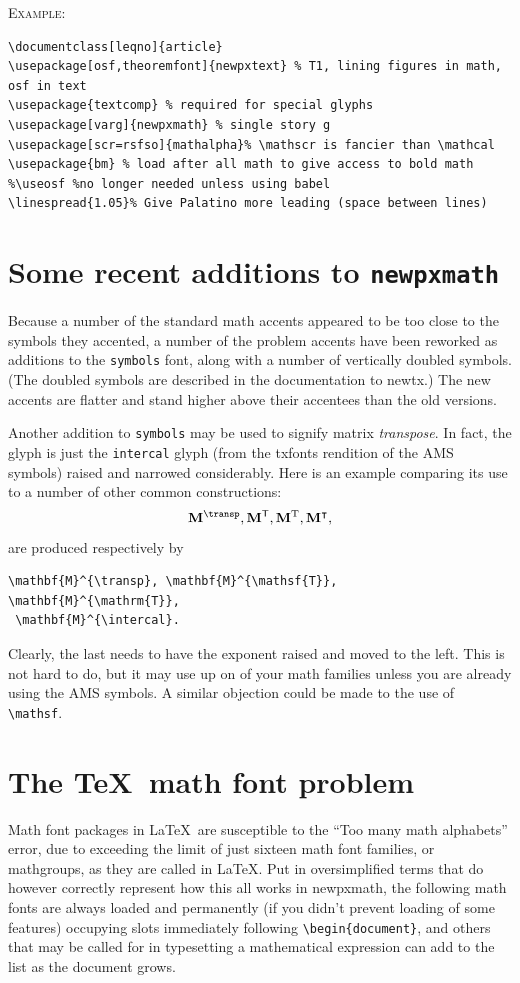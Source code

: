 \documentclass[11pt]{article}
\theoremstyle{oldplain}
\theoremstyle{plain}
\begin{document}
\textsc{Example:}
\begin{verbatim}
\documentclass[leqno]{article}
\usepackage[osf,theoremfont]{newpxtext} % T1, lining figures in math, osf in text
\usepackage{textcomp} % required for special glyphs
\usepackage[varg]{newpxmath} % single story g
\usepackage[scr=rsfso]{mathalpha}% \mathscr is fancier than \mathcal
\usepackage{bm} % load after all math to give access to bold math
%\useosf %no longer needed unless using babel
\linespread{1.05}% Give Palatino more leading (space between lines)
\end{verbatim}

\section{Some recent additions to \texttt{newpxmath}}
Because a number of the standard math accents appeared to be too close to the symbols they accented, a number of the problem accents have been reworked as additions to the {\tt symbols} font, along with a number of vertically doubled symbols. (The doubled symbols are described in the documentation to newtx.) The new accents are flatter and stand higher above their accentees than the old versions.

Another addition to {\tt symbols} may be used to signify matrix \emph{transpose}. In fact, the glyph is just the {\tt intercal} glyph (from the txfonts rendition of the AMS symbols) raised and narrowed considerably. Here is an example comparing its use to a number of other common constructions:
\[\mathbf{M}^{\transp}, \mathbf{M}^{\mathsf{T}}, \mathbf{M}^{\mathrm{T}}, \mathbf{M}^{\intercal},\]
are produced respectively by
\begin{verbatim}
\mathbf{M}^{\transp}, \mathbf{M}^{\mathsf{T}}, \mathbf{M}^{\mathrm{T}},
 \mathbf{M}^{\intercal}.
\end{verbatim}
Clearly, the last needs to have the exponent raised and moved to the left. This is not hard to do, but it may use up on of your math families unless you are already using the AMS symbols. A similar objection could be made to the use of \verb|\mathsf|.
\section{The \TeX\ math font problem}
Math font packages in \LaTeX\ are susceptible to the ``Too many math alphabets'' error, due to exceeding the limit of just sixteen math font families, or mathgroups, as they are called in \LaTeX. Put in oversimplified terms that do however correctly represent how this all works in \textsf{newpxmath}, the following math fonts are always loaded and permanently (if you didn't prevent loading of some features) occupying slots immediately following \verb|\begin{document}|, and others that may be called for in typesetting a mathematical expression can add to the list as the document grows.
\end{document}
